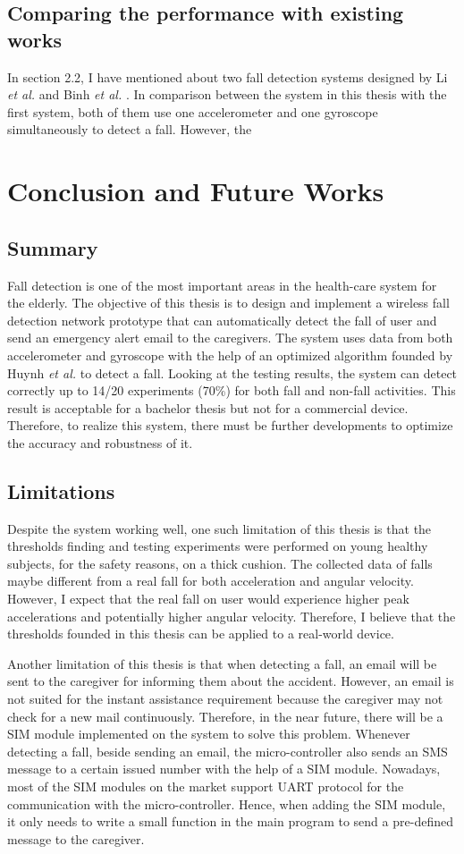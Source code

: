 \documentclass[letterpaper,12pt,titlepage,oneside,final]{book}
\begin{document}
\section{Comparing the performance with existing works}
In section 2.2, I have mentioned about two fall detection systems designed by Li \textit{et al.} \cite{li} and Binh \textit{et al.} \cite{binh}. 
In comparison between the system in this thesis with the first system, both of them use one accelerometer and one gyroscope simultaneously to detect a fall. However, the 
\chapter{Conclusion and Future Works}

\section{Summary}
Fall detection is one of the most important areas in the health-care system for the elderly. The objective of this thesis is to design and implement a wireless fall detection network prototype that can automatically detect the fall of user and send an emergency alert email to the caregivers. The system uses data from both accelerometer and gyroscope with the help of an optimized algorithm founded by Huynh \textit{et al.} \cite{main_quoc} to detect a fall. Looking at the testing results, the system can detect correctly up to 14/20 experiments (70\%) for both fall and non-fall activities. This result is acceptable for a bachelor thesis but not for a commercial device. Therefore, to realize this system, there must be further developments to optimize the accuracy and robustness of it.
\section{Limitations}
Despite the system working well, one such limitation of this thesis is that the thresholds finding and testing experiments were performed on young healthy subjects, for the safety reasons, on a thick cushion. The collected data of falls maybe different from a real fall for both acceleration and angular velocity. However, I expect that the real fall on user would experience higher peak accelerations and potentially higher angular velocity. Therefore, I believe that the thresholds founded in this thesis can be applied to a real-world device. \par 
Another limitation of this thesis is that when detecting a fall, an email will be sent to the caregiver for informing them about the accident. However, an email is not suited for the instant assistance requirement because the caregiver may not check for a new mail continuously. Therefore, in the near future, there will be a SIM module implemented on the system to solve this problem. Whenever detecting a fall, beside sending an email, the micro-controller also sends an SMS message to a certain issued number with the help of a SIM module. Nowadays, most of the SIM modules on the market support UART protocol for the communication with the micro-controller. Hence, when adding the SIM module, it only needs to write a small function in the main program to send a pre-defined message to the caregiver. 
\end{document}
